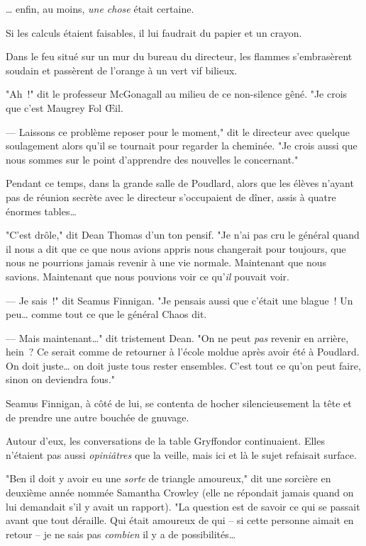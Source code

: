 … enfin, au moins, \emph{une chose} était certaine.

Si les calculs étaient faisables, il lui faudrait du papier et un crayon.

Dans le feu situé sur un mur du bureau du directeur, les flammes s'embrasèrent soudain et passèrent de l'orange à un vert vif bilieux.

"Ah~!" dit le professeur McGonagall au milieu de ce non-silence gêné. "Je crois que c'est Maugrey Fol Œil.

--- Laissons ce problème reposer pour le moment," dit le directeur avec quelque soulagement alors qu'il se tournait pour regarder la cheminée. "Je crois aussi que nous sommes sur le point d'apprendre des nouvelles le concernant."


Pendant ce temps, dans la grande salle de Poudlard, alors que les élèves n'ayant pas de réunion secrète avec le directeur s'occupaient de dîner, assis à quatre énormes tables…

"C'est drôle," dit Dean Thomas d'un ton pensif. "Je n'ai pas cru le général quand il nous a dit que ce que nous avions appris nous changerait pour toujours, que nous ne pourrions jamais revenir à une vie normale. Maintenant que nous savions. Maintenant que nous pouvions voir ce qu'\emph{il} pouvait voir.

--- Je sais~!" dit Seamus Finnigan. "Je pensais aussi que c'était une blague~! Un peu… comme tout ce que le général Chaos dit.

--- Mais maintenant…" dit tristement Dean. "On ne peut \emph{pas} revenir en arrière, hein~? Ce serait comme de retourner à l'école moldue après avoir été à Poudlard. On doit juste… on doit juste tous rester ensembles. C'est tout ce qu'on peut faire, sinon on deviendra fous."

Seamus Finnigan, à côté de lui, se contenta de hocher silencieusement la tête et de prendre une autre bouchée de gnuvage.

Autour d'eux, les conversations de la table Gryffondor continuaient. Elles n'étaient pas aussi \emph{opiniâtres} que la veille, mais ici et là le sujet refaisait surface.

"Ben il doit y avoir eu une \emph{sorte} de triangle amoureux," dit une sorcière en deuxième année nommée Samantha Crowley (elle ne répondait jamais quand on lui demandait s'il y avait un rapport). "La question est de savoir ce qui se passait avant que tout déraille. Qui était amoureux de qui -- si cette personne aimait en retour -- je ne sais pas \emph{combien} il y a de possibilités…

